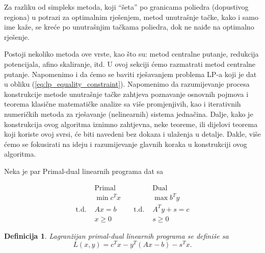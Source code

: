 \documentclass[a4paper, utf8, 11pt, colorlinks]{book}
\newtheorem{definition}{Definicija}[chapter]
\theoremstyle{definition}
\begin{document}
Za razliku od simpleks metoda, koji ``šeta'' po granicama poliedra (dopustivog regiona) u potrazi za optimalnim rješenjem, {metod unutrašnje tačke}, kako i samo ime kaže, se kreće po unutrašnjim tačkama poliedra,  dok ne naiđe na  optimalno rješenje. 

Postoji nekoliko metoda ove vrste, kao što su: metod centralne putanje, redukcija potencijala, afino skaliranje, itd. U ovoj sekciji ćemo razmatrati metod centralne putanje. Napomenimo i da ćemo se baviti rješavanjem problema LP-a koji je dat u obliku (\ref{eq:lp_equality_constraint}). Napomenimo da razumijevanje procesa konstrukcije metode  unutrašnje tačke zahtjeva poznavanje osnovnih pojmova i teorema klasične matematičke analize sa više promjenjivih, kao i iterativnih numeričkih metoda za rješavanje (nelinearnih) sistema jednačina. Dalje, kako je konstrukcija ovog algoritma iznimno zahtjevna, neke teoreme, ili dijelovi teorema koji koriste ovoj svrsi, će biti  navedeni bez dokaza i ulaženja u detalje. Dakle, više ćemo se fokusirati na ideju i razumijevanje glavnih koraka u konstrukciji ovog algoritma.

Neka je par Primal-dual linearnih programa dat sa

$$ \begin{array}{llll}
	&\mbox{Primal}            &\quad &\mbox{Dual}     \\
	&\min  c^T x              &\quad &\max  b^T y \\
\mbox{t.d.\ }	&  Ax = b      &\quad \mbox{t.d.\ } &   A^Ty + s = c \\
	& x \geq 0                &\quad &  s \geq 0
\end{array}
$$

  
\begin{definition}
Lagranžijan primal-dual linearnih programa se definiše sa 
\begin{equation}
	L(x,y) = c^Tx - y^T(Ax - b) - s^T x.
\end{equation}
\end{definition}
\end{document}
